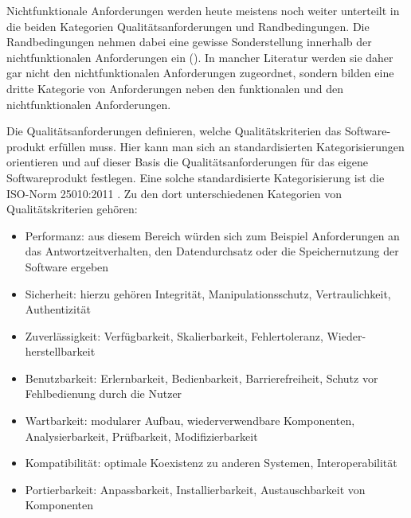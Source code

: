 Nichtfunktionale Anforderungen werden heute meistens noch weiter unterteilt in die beiden Kategorien Qualitätsanforderungen und Randbedingungen. Die Randbedingungen nehmen dabei eine gewisse Sonderstellung innerhalb der nichtfunktionalen Anforderungen ein (\su). In mancher Literatur werden sie daher gar nicht den nichtfunktionalen Anforderungen zugeordnet, sondern bilden eine dritte Kategorie von Anforderungen neben den funktionalen und den nichtfunktionalen Anforderungen.


Die Qualitätsanforderungen definieren, welche Qualitätskriterien das Software-
\linebreak %
produkt erfüllen muss. Hier kann man sich an standardisierten Kategorisierungen orientieren und auf dieser Basis die Qualitätsanforderungen für das eigene Softwareprodukt festlegen. Eine solche standardisierte Kategorisierung ist die ISO-Norm 25010:2011 \cite{iso11}. Zu den dort unterschiedenen Kategorien von Qualitätskriterien gehören:

\begin{itemize}
	\item Performanz: aus diesem Bereich würden sich zum Beispiel Anforderungen an das Antwortzeitverhalten, den Datendurchsatz oder die Speichernutzung der Software ergeben
	\item Sicherheit: hierzu gehören Integrität, Manipulationsschutz, Vertraulichkeit, \linebreak %
		Authentizität
	\item Zuverlässigkeit: \zb Verfügbarkeit, Skalierbarkeit, Fehlertoleranz, Wieder-\linebreak %
		herstellbarkeit
	\item Benutzbarkeit: \zb Erlernbarkeit, Bedienbarkeit, Barrierefreiheit, Schutz vor Fehlbedienung durch die Nutzer
	\item Wartbarkeit: \zb modularer Aufbau, wiederverwendbare Komponenten, \linebreak %
		Analysierbarkeit, Prüfbarkeit, Modifizierbarkeit
	\item Kompatibilität: \zb optimale Koexistenz zu anderen Systemen, Interopera\-bilität
	\item Portierbarkeit: \zb Anpassbarkeit, Installierbarkeit, Austauschbarkeit von \linebreak %
		Komponenten
\end{itemize}

